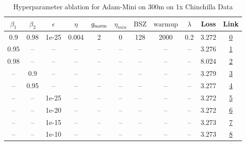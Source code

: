 \begin{table}[H]
\centering
\caption{Hyperparameter ablation for Adam-Mini on 300m on 1x Chinchilla Data}
\label{tab:ablation_adam-mini_300m_on_1x_chinchilla_data}
\begin{tabular}{ccccccccccc}
\toprule
$\beta_1$ & $\beta_2$ & $\epsilon$ & $\eta$ & $g_{\mathrm{norm}}$ & $\eta_{min}$ & $\mathrm{BSZ}$ & $\mathrm{warmup}$ & $\lambda$ & Loss & Link \\
\midrule
0.9 & 0.98 & 1e-25 & 0.004 & 2 & 0 & 128 & 2000 & 0.2 & 3.272 & \href{https://wandb.ai/marin-community/optimizer-scaling/runs/sweep-300m-6B-minimf93988lr0.004-wd0.2-minlr0-warmup2000-b10.9-b-1a622b}{0} \\
\midrule
0.95 & -- & -- & -- & -- & -- & -- & -- & -- & 3.276 & \href{https://wandb.ai/marin-community/optimizer-scaling/runs/sweep-300m-6B-minic68fa6lr0.004-wd0.2-minlr0-warmup2000-b10.95-b-61c14d}{1} \\
0.98 & -- & -- & -- & -- & -- & -- & -- & -- & 8.024 & \href{https://wandb.ai/marin-community/optimizer-scaling/runs/sweep-300m-6B-minie808f4lr0.004-wd0.2-minlr0-warmup2000-b10.98-b-2ad92e}{2} \\
-- & 0.9 & -- & -- & -- & -- & -- & -- & -- & 3.279 & \href{https://wandb.ai/marin-community/optimizer-scaling/runs/sweep-300m-6B-minim7e5831lr0.004-wd0.2-minlr0-warmup2000-b10.9-b-3f89ca}{3} \\
-- & 0.95 & -- & -- & -- & -- & -- & -- & -- & 3.277 & \href{https://wandb.ai/marin-community/optimizer-scaling/runs/sweep-300m-6B-mini3022d1lr0.004-wd0.2-minlr0-warmup2000-b10.9-b2-0db993}{4} \\
-- & -- & 1e-25 & -- & -- & -- & -- & -- & -- & 3.272 & \href{https://wandb.ai/marin-community/optimizer-scaling/runs/sweep-300m-6B-minimf93988lr0.004-wd0.2-minlr0-warmup2000-b10.9-b-1a622b}{5} \\
-- & -- & 1e-20 & -- & -- & -- & -- & -- & -- & 3.272 & \href{https://wandb.ai/marin-community/optimizer-scaling/runs/sweep-300m-6B-mini3ff087lr0.004-wd0.2-minlr0-warmup2000-b10.9-b2-e0d948}{6} \\
-- & -- & 1e-15 & -- & -- & -- & -- & -- & -- & 3.273 & \href{https://wandb.ai/marin-community/optimizer-scaling/runs/sweep-300m-6B-minim4cb19elr0.004-wd0.2-minlr0-warmup2000-b10.9-b-4a59e2}{7} \\
-- & -- & 1e-10 & -- & -- & -- & -- & -- & -- & 3.273 & \href{https://wandb.ai/marin-community/optimizer-scaling/runs/sweep-300m-6B-minim8dac9blr0.004-wd0.2-minlr0-warmup2000-b10.9-b-2ed5f7}{8} \\

\end{tabular}
\end{table}
